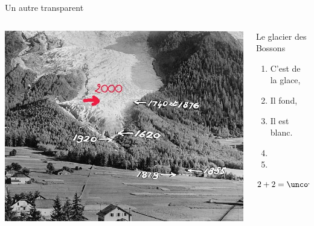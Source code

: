 \documentclass[11pt]{beamer}
\begin{document}
\begin{frame}{Un autre transparent}
  \begin{columns}[c]
    \begin{column}{.6\textwidth}
      \includegraphics[width=\textwidth]{bossons}
    \end{column}
    \begin{column}{.4\textwidth}
      \begin{block}{Le glacier des Bossons}
        \begin{enumerate}
        \item<1,3> C'est de la glace,
        \item<2-> Il fond,
        \item<3> Il est blanc. 
        \item<4>
        \item<5>       
        \end{enumerate}
      \begin{equation}
      2 + 2 = \uncover<2>{3}
      \end{equation}        
      
      \end{block}         
    \end{column}
  \end{columns}
\end{frame}
\end{document}

